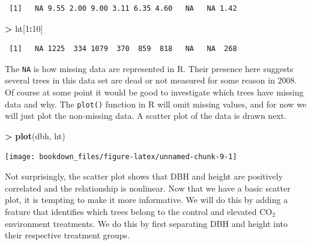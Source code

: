 \documentclass[]{krantz}
\makeatletter
\newenvironment{Shaded}{\begin{snugshade}}{\end{snugshade}}
\newcommand{\DecValTok}[1]{\textcolor[rgb]{0.06,0.06,0.06}{#1}}
\newcommand{\KeywordTok}[1]{\textcolor[rgb]{0.27,0.27,0.27}{\textbf{#1}}}
\newcommand{\NormalTok}[1]{#1}
\newcommand{\OperatorTok}[1]{\textcolor[rgb]{0.43,0.43,0.43}{\textbf{#1}}}
\newcommand{\StringTok}[1]{\textcolor[rgb]{0.5,0.5,0.5}{#1}}
\newenvironment{kframe}{%
\medskip{}
\setlength{\fboxsep}{.8em}
 \def\at@end@of@kframe{}%
 \ifinner\ifhmode%
  \def\at@end@of@kframe{\end{minipage}}%
  \begin{minipage}{\columnwidth}%
 \fi\fi%
 \def\FrameCommand##1{\hskip\@totalleftmargin \hskip-\fboxsep
 \colorbox{shadecolor}{##1}\hskip-\fboxsep
     \hskip-\linewidth \hskip-\@totalleftmargin \hskip\columnwidth}%
 \MakeFramed {\advance\hsize-\width
   \@totalleftmargin\z@ \linewidth\hsize
   \@setminipage}}%
 {\par\unskip\endMakeFramed%
 \at@end@of@kframe}
\renewenvironment{Shaded}{\begin{kframe}}{\end{kframe}}
\makeatother
\begin{document}
\begin{verbatim}
 [1]   NA 9.55 2.00 9.00 3.11 6.35 4.60   NA   NA 1.42
\end{verbatim}

\begin{Shaded}
\begin{Highlighting}[]
\OperatorTok{>}\StringTok{ }\NormalTok{ht[}\DecValTok{1}\OperatorTok{:}\DecValTok{10}\NormalTok{]}
\end{Highlighting}
\end{Shaded}

\begin{verbatim}
 [1]   NA 1225  334 1079  370  859  818   NA   NA  268
\end{verbatim}

The \texttt{NA} is how missing data are represented in R. Their presence here suggests several trees in this data set are dead or not measured for some reason in 2008. Of course at some point it would be good to investigate which trees have missing data and why. The \texttt{plot()} function in R will omit missing values, and for now we will just plot the non-missing data. A scatter plot of the data is drawn next.

\begin{Shaded}
\begin{Highlighting}[]
\OperatorTok{>}\StringTok{ }\KeywordTok{plot}\NormalTok{(dbh, ht)}
\end{Highlighting}
\end{Shaded}

\begin{center}\texttt{[image: bookdown\_files/figure-latex/unnamed-chunk-9-1]} \end{center}

Not surprisingly, the scatter plot shows that DBH and height are positively correlated and the relationship is nonlinear. Now that we have a basic scatter plot, it is tempting to make it more informative. We will do this by adding a feature that identifies which trees belong to the control and elevated CO\(_2\) environment treatments. We do this by first separating DBH and height into their respective treatment groups.
\end{document}
